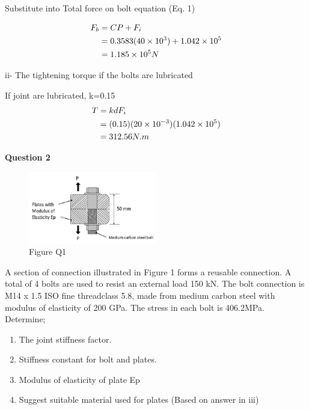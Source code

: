 \documentclass[a4paper, fleqn]{article}
\providecommand{\sci}[1]{\protect\ensuremath{\times 10^{\StrSubstitute[0]{#1}{e}{}}}}
\begin{document}
Substitute into Total force on bolt equation (Eq. 1)

\begin{equation*}
    \begin{aligned}
        F_b&=CP+F_i\\
        &=0.3583(40\sci{e3})+1.042\sci{e5}\\
        &=1.185\sci{e5}N
    \end{aligned}
\end{equation*}

ii- The tightening torque if the bolts are lubricated

If joint are lubricated, k=0.15
\begin{equation}
    \begin{aligned}
        T&=kdF_i\\
        &=(0.15)(20\sci{e-3})(1.042\sci{e5})\\
        &=312.56N.m
    \end{aligned}
\end{equation}

\newpage
\textbf{Question 2}

\begin{figure}[h]
    \centering
    \includegraphics[width=0.5\textwidth]{t31-q2.png}
    \caption{Figure Q1}
\end{figure}

A section of connection illustrated in Figure 1 forms a reusable connection. A total of 4 bolts are used to resist an external load 150 kN. The bolt connection is M14 x 1.5 ISO fine threadclass 5.8, made from medium carbon steel with modulus of elasticity of 200 GPa. The stress in each bolt is 406.2MPa. Determine;

\begin{enumerate}[label=(\roman*)]
    \item The joint stiffness factor.
    \item Stiffness constant for bolt and plates.
    \item Modulus of elasticity of plate Ep
    \item Suggest suitable material used for plates (Based on answer in iii)
\end{enumerate}
\end{document}
